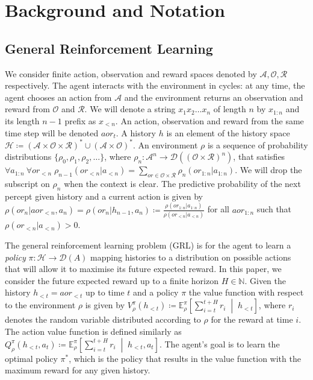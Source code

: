 \documentclass[letterpaper]{article} %
\newcommand {\Obs}{\mathcal{O}}
\newcommand {\A}{\mathcal{A}}
\newcommand {\Hist}{\mathcal{H}}
\newcommand {\Dist}{\mathcal{D}}
\newcommand {\Reward}{\mathcal{R}}
\newcommand {\E}{\mathbb{E}}
\newcommand {\N}{\mathbb{N}}
\newcommand{\vbar}{\;\middle|\;}
\theoremstyle{definition}
\begin{document}
\section{Background and Notation}

\subsection{General Reinforcement Learning}
We consider finite action, observation and reward spaces denoted by $\A, \Obs, \Reward$ respectively. The agent interacts with the environment in cycles: at any time, the agent chooses an action from $\A$ and the environment returns an observation and reward from $\Obs$ and $\Reward$. We will denote a string $x_1x_2\ldots x_n$ of length $n$ by $x_{1:n}$ and its length $n-1$ prefix as $x_{<n}$. An action, observation and reward from the same time step will be denoted $aor_t$. A history $h$ is an element of the history space $\Hist \coloneqq (\A \times \Obs \times \Reward)^* \cup (\A \times \Obs)^*$. An environment $\rho$ is a sequence of probability distributions $\{\rho_0, \rho_1, \rho_2, \ldots \}$, where $\rho_n: \A^{n} \to \Dist((\Obs \times \Reward)^n)$, that satisfies $\forall a_{1:n}~ \forall or_{<n} \; \rho_{n-1}(or_{<n} | a_{<n}) = \sum_{or \in \Obs \times \Reward} \rho_n(or_{1:n} | a_{1:n})$. We will drop the subscript on $\rho_n$ when the context is clear. The predictive probability of the next percept given history and a current action is given by $\rho(or_n | aor_{<n}, a_n) = \rho(or_n | h_{n-1}, a_n) \coloneqq \frac{\rho(or_{1:n} | a_{1:n})}{\rho(or_{<n} | a_{<n})}$ for all $aor_{1:n}$ such that $\rho(or_{<n} | a_{<n}) > 0$. 

The general reinforcement learning problem (GRL) is for the agent to learn a \textit{policy} $\pi: \Hist \to \Dist(A)$ mapping histories to a distribution on possible actions that will allow it to maximise its future expected reward. In this paper, we consider the future expected reward up to a finite horizon $H \in \N$. 
Given the history $h_{<t} = aor_{<t}$ up to time $t$ and a policy $\pi$ the value function with respect to the environment $\rho$ is given by $V_{\rho}^{\pi}(h_{<t}) \coloneqq \E_{\rho}^{\pi} \left[  \sum_{i = t}^{t+H} r_i \vbar h_{<t}  \right]$, where $r_i$ denotes the random variable distributed according to $\rho$ for the reward at time $i$. The action value function is defined similarly as $Q_{\rho}^{\pi}(h_{<t}, a_{t}) \coloneqq \E_{\rho}^{\pi} \left[  \sum_{i = t}^{t+H} r_i \vbar h_{<t}, a_{t}  \right]$. The agent's goal is to learn the optimal policy $\pi^*$, which is the policy that results in the value function with the maximum reward for any given history.
\end{document}
